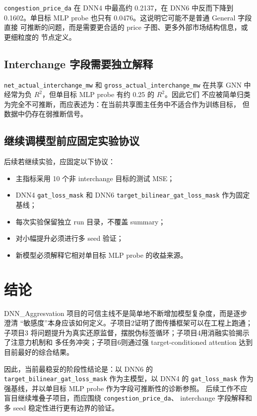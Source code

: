 \documentclass[UTF8,a4paper,11pt]{ctexart}
\begin{document}
\texttt{congestion\_price\_da} 在 DNN4 中最高约 0.2137，在 DNN6 中反而下降到
0.1602。单目标 MLP probe 也只有 0.0476。这说明它可能不是普通 General 字段直接
可推断的问题，而是需要更合适的 price 子图、更多外部市场结构信息，或更细粒度的
节点定义。

\subsection{Interchange 字段需要独立解释}

\texttt{net\_actual\_interchange\_mw} 和 \texttt{gross\_actual\_interchange\_mw}
在共享 GNN 中经常为负 $R^2$，但单目标 MLP probe 有约 0.25 的 $R^2$。因此它们
不应被简单归类为完全不可推断，而应表述为：在当前共享图主任务中不适合作为训练目标，
但数据中仍存在弱推断信号。

\subsection{继续调模型前应固定实验协议}

后续若继续实验，应固定以下协议：
\begin{itemize}
  \item 主指标采用 10 个非 interchange 目标的测试 MSE；
  \item DNN4 \texttt{gat\_loss\_mask} 和 DNN6
  \texttt{target\_bilinear\_gat\_loss\_mask} 作为固定基线；
  \item 每次实验保留独立 run 目录，不覆盖 summary；
  \item 对小幅提升必须进行多 seed 验证；
  \item 新模型必须解释它相对单目标 MLP probe 的收益来源。
\end{itemize}

\section{结论}

DNN\_Aggresvation 项目的可信主线不是简单地不断增加模型复杂度，而是逐步澄清
``敏感度''本身应该如何定义。子项目2证明了图传播框架可以在工程上跑通；子项目3
将问题提升为真实还原监督，摆脱伪标签循环；子项目4用消融实验揭示了注意力机制和
多任务冲突；子项目6则通过强 target-conditioned attention 达到目前最好的综合结果。

因此，当前最稳妥的阶段性结论是：以 DNN6 的
\texttt{target\_bilinear\_gat\_loss\_mask} 作为主模型，以 DNN4 的
\texttt{gat\_loss\_mask} 作为强基线，并以单目标 MLP probe 作为字段可推断性的诊断参照。
后续工作不应盲目继续堆叠子项目，而应围绕 \texttt{congestion\_price\_da}、
interchange 字段解释和多 seed 稳定性进行更有边界的验证。
\end{document}
